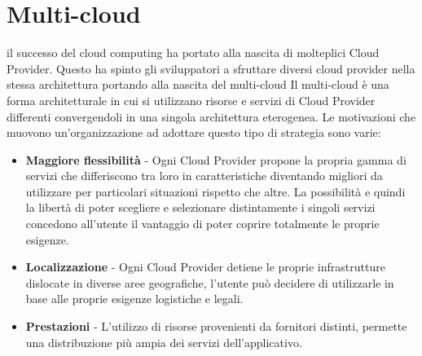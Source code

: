 
\section{Multi-cloud}
il successo del cloud computing ha portato alla nascita di molteplici Cloud Provider. Questo ha spinto gli sviluppatori a sfruttare diversi cloud provider nella stessa architettura portando alla nascita del multi-cloud
Il multi-cloud è una forma architetturale in cui si utilizzano risorse e servizi di Cloud Provider differenti convergendoli in una singola architettura eterogenea. 
Le motivazioni che muovono un'organizzazione ad adottare questo tipo di strategia sono varie:
\begin{itemize}
\item \textbf{Maggiore flessibilità} - Ogni Cloud Provider propone la propria gamma di servizi che differiscono tra loro in caratteristiche diventando migliori da utilizzare per particolari situazioni rispetto che altre. La possibilità e quindi la libertà di poter scegliere e selezionare distintamente i singoli servizi concedono all'utente il vantaggio di poter coprire totalmente le proprie esigenze.
\item \textbf{Localizzazione} - Ogni Cloud Provider detiene le proprie infrastrutture dislocate in diverse aree geografiche, l'utente può decidere di utilizzarle in base alle proprie esigenze logistiche e legali.
\item \textbf{Prestazioni} - L'utilizzo di risorse provenienti da fornitori distinti, permette una distribuzione più ampia dei servizi dell'applicativo.
\end{itemize}
